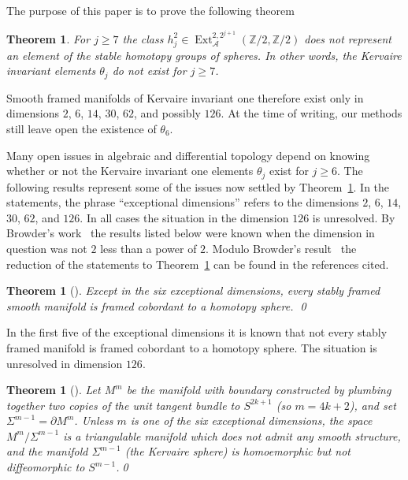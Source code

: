 \documentclass{amsart}
\newtheorem{thm}[equation]{Theorem}
\theoremstyle{definition}
\theoremstyle{remark}
\newcommand{\ext}{\operatorname{Ext}}
\newcommand{\Z}{{\mathbb Z}}
\newcommand{\sta}{\mathcal A}
\begin{document}
The purpose of this paper is to prove the following theorem
\begin{thm}
\label{thm:20} For $j\ge 7$ the class $h_{j}^{2}\in
\ext_{\sta}^{2,2^{j+1}}(\Z/2,\Z/2)$ does not represent an element of the
stable homotopy groups of spheres.  In other words, the Kervaire
invariant elements $\theta_{j}$ do not exist for $j\ge 7$.
\end{thm}

Smooth framed manifolds of Kervaire invariant one therefore exist only
in dimensions $2$, $6$, $14$, $30$, $62$, and possibly $126$.  At the
time of writing, our methods still leave open the existence of
$\theta_{6}$.

Many open issues in algebraic and differential topology depend on
knowing whether or not the Kervaire invariant one elements
$\theta_{j}$ exist for $j\ge 6$.  The following results represent some
of the issues now settled by Theorem~\ref{thm:20}.  In the statements,
the phrase ``exceptional dimensions'' refers to the dimensions $2$,
$6$, $14$, $30$, $62$, and $126$.  In all cases the situation in the
dimension $126$ is unresolved.  By Browder's
work~\cite{browder69:_kervair} the results listed below were known
when the dimension in question was not $2$ less than a power of $2$.
Modulo Browder's result~\cite{browder69:_kervair} the reduction of the
statements to Theorem~\ref{thm:20} can be found in the references
cited.

\begin{thm}[\cite{kervaire63:_group,MR802786}] 
\label{thm:69} Except in the six
exceptional dimensions, every stably framed smooth manifold is framed
cobordant to a homotopy sphere. \qed
\end{thm}

In the first five of the exceptional dimensions it is known that not
every stably framed manifold is framed cobordant to a homotopy
sphere.  The situation is unresolved in dimension $126$.

\begin{thm}[\cite{kervaire63:_group}]
\label{thm:110} Let $M^{m}$ be the manifold with boundary constructed
by plumbing together two copies of the unit tangent bundle to
$S^{2k+1}$ (so $m=4k+2$), and set $\Sigma^{m-1}=\partial M^{m}$.
Unless $m$ is one of the six exceptional dimensions, the space
$M^{m}/\Sigma^{m-1}$ is a triangulable manifold which does not admit
any smooth structure, and the manifold $\Sigma^{m-1}$ (the Kervaire
sphere) is homoemorphic but not diffeomorphic to $S^{m-1}$.\qed
\end{thm}
\end{document}
